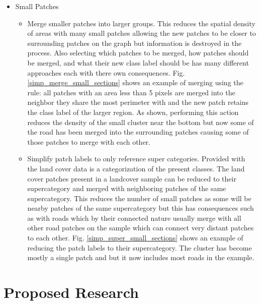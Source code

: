 \documentclass[conference]{IEEEtran}
\begin{document}
\begin{itemize}
		\item Small Patches
		\begin{itemize}
			\item Merge smaller patches into larger groups. This reduces the spatial density of areas with many small patches allowing the new patches to be closer to surrounding patches on the graph but information is destroyed in the process. Also selecting which patches to be merged, how patches should be merged, and what their new class label should be has many different approaches each with there own consequences. Fig. \ref{simp_merge_small_sections} shows an example of merging using the rule: all patches with an area less than 5 pixels are merged into the neighbor they share the most perimeter with and the new patch retains the class label of the larger region. As shown, performing this action reduces the density of the small cluster near the bottom but now some of the road has been merged into the surrounding patches causing some of those patches to merge with each other.
			\item Simplify patch labels to only reference super categories. Provided with the land cover data is a categorization of the present classes. The land cover patches present in a landcover sample can be reduced to their supercategory and merged with neighboring patches of the same supercategory. This reduces the number of small patches as some will be nearby patches of the same supercategory but this has consequences such as with roads which by their connected nature usually merge with all other road patches on the sample which can connect very distant patches to each other. Fig. \ref{simp_super_small_sections} shows an example of reducing the patch labels to their supercategory. The cluster has become mostly a single patch and but it now includes most roads in the example. 
		\end{itemize}
	
	\end{itemize}	
	
	\section{Proposed Research}
\end{document}
